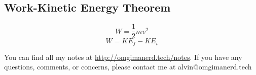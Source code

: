 \documentclass{math}
\begin{document}
\subsection*{Work-Kinetic Energy Theorem}
\[ W = \frac{1}{2}mv^2 \]
\[ W = KE_f-KE_i \]

\begin{center}
  You can find all my notes at \url{http://omgimanerd.tech/notes}. If you have
  any questions, comments, or concerns, please contact me at
  alvin@omgimanerd.tech
\end{center}
\end{document}

